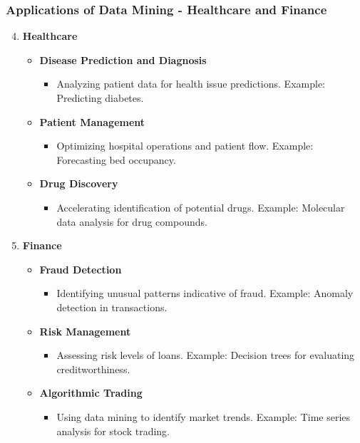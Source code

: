 \documentclass[aspectratio=169]{beamer}
\begin{document}
\begin{frame}[fragile]
    \frametitle{Applications of Data Mining - Healthcare and Finance}
    \begin{enumerate}
        \setcounter{enumi}{3}
        \item \textbf{Healthcare}
            \begin{itemize}
                \item \textbf{Disease Prediction and Diagnosis}
                    \begin{itemize}
                        \item Analyzing patient data for health issue predictions. Example: Predicting diabetes.
                    \end{itemize}
                \item \textbf{Patient Management}
                    \begin{itemize}
                        \item Optimizing hospital operations and patient flow. Example: Forecasting bed occupancy.
                    \end{itemize}
                \item \textbf{Drug Discovery}
                    \begin{itemize}
                        \item Accelerating identification of potential drugs. Example: Molecular data analysis for drug compounds.
                    \end{itemize}
            \end{itemize}
        \item \textbf{Finance}
            \begin{itemize}
                \item \textbf{Fraud Detection}
                    \begin{itemize}
                        \item Identifying unusual patterns indicative of fraud. Example: Anomaly detection in transactions.
                    \end{itemize}
                \item \textbf{Risk Management}
                    \begin{itemize}
                        \item Assessing risk levels of loans. Example: Decision trees for evaluating creditworthiness.
                    \end{itemize}
                \item \textbf{Algorithmic Trading}
                    \begin{itemize}
                        \item Using data mining to identify market trends. Example: Time series analysis for stock trading.
                    \end{itemize}
            \end{itemize}
    \end{enumerate}
\end{frame}
\end{document}

